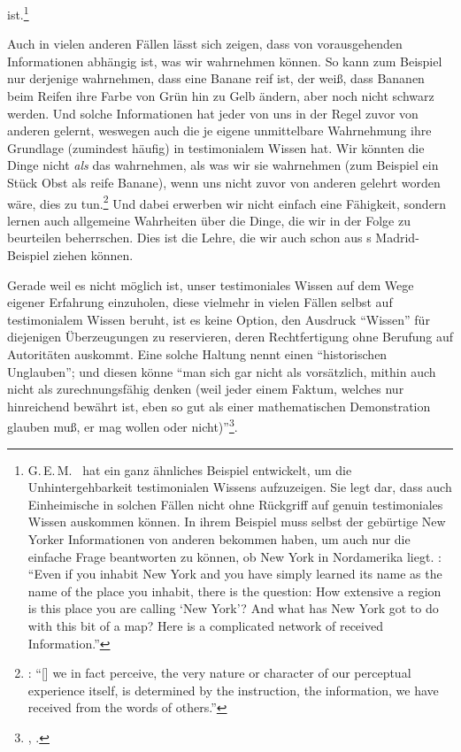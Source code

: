 ist.\footnote{G.\,E.\,M.~ hat ein ganz
ähnliches Beispiel entwickelt, um die Unhintergehbarkeit testimonialen Wissens
aufzuzeigen. Sie legt dar, dass auch Einheimische in solchen Fällen nicht ohne
Rückgriff auf genuin testimoniales Wissen auskommen können. In ihrem Beispiel
muss selbst der gebürtige New Yorker Informationen von anderen bekommen haben,
um auch nur die einfache Frage beantworten zu können, ob New York in Nordamerika
liegt. \cite[Vgl.][4]{Anscombe:WhatIsIttoBelieveSomeone2008}:
\enquote{Even if you inhabit New York and you have simply learned its name as
the name of the place you inhabit, there is the question: How extensive a region is this place you are
calling \enquote{New York}? And what has New York got to do with this bit of a
map? Here is a complicated network of received Information.}}


Auch in vielen anderen Fällen lässt sich zeigen, dass von vorausgehenden
Informationen abhängig ist, was wir wahrnehmen können. So kann zum Beispiel nur derjenige wahrnehmen,
dass eine Banane reif ist, der weiß, dass Bananen beim Reifen ihre Farbe von
Grün hin zu Gelb ändern, aber noch nicht schwarz werden. Und solche
Informationen hat jeder von uns in der Regel zuvor von anderen gelernt, weswegen
auch die je eigene unmittelbare Wahrnehmung ihre Grundlage (zumindest häufig) in
testimonialem Wissen hat. Wir könnten die Dinge nicht \emph{als} das wahrnehmen,
als was wir sie wahrnehmen (zum Beispiel ein Stück Obst als reife Banane), wenn
uns nicht zuvor von anderen gelehrt worden wäre, dies zu
tun.\footnote{\cite[Vgl.][26]{Strawson:KnowingfromWords1994}:
\enquote{[] we in fact perceive, the very nature or character of
our perceptual experience itself, is determined by the instruction, the information,
we have received from the words of others.}} Und dabei erwerben wir nicht
einfach eine Fähigkeit, sondern lernen auch allgemeine Wahrheiten über die
Dinge, die wir in der Folge zu beurteilen beherrschen. Dies ist die Lehre, die
wir auch schon aus s Madrid-Beispiel ziehen können.


Gerade weil es nicht möglich ist, unser testimoniales Wissen auf dem Wege
eigener Erfahrung einzuholen, diese vielmehr in vielen Fällen selbst auf testimonialem
Wissen beruht, ist es keine Option, den Ausdruck \enquote{Wissen} für diejenigen
Überzeugungen zu reservieren, deren Rechtfertigung ohne Berufung auf Autoritäten
auskommt. Eine solche Haltung nennt  einen
\enquote{historischen Unglauben}; und diesen könne \enquote{man sich gar nicht
als vorsätzlich, mithin auch nicht als zurechnungsfähig
denken (weil jeder einem Faktum, welches nur hinreichend
bewährt ist, eben so gut als einer mathematischen
Demonstration glauben muß, er mag wollen oder nicht)}\footnote{\Cite[][A
328]{Kant:Washeisst:SichimDenkenorientieren?1977}, \cite[][VIII:
146.8--11]{Kant:GesammelteWerke1900ff.}.}.


